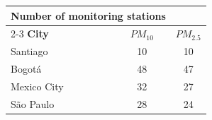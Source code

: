 \vspace{0.1cm}
\begin{center}
\tiny
\begin{tabular}{lcc}
\toprule
\toprule
\multicolumn{2}{c}{\textbf{Number of monitoring stations}} \\
\cmidrule{2-3}
\textbf{City} & $PM_{10}$ & $PM_{2.5}$ \\
\midrule
  Santiago &  10 &  10 \\ 
  Bogotá &  48 &  47 \\ 
  Mexico City &  32 &  27 \\ 
  São Paulo &  28 &  24 \\ 
\bottomrule
\bottomrule
\end{tabular}
\end{center}
